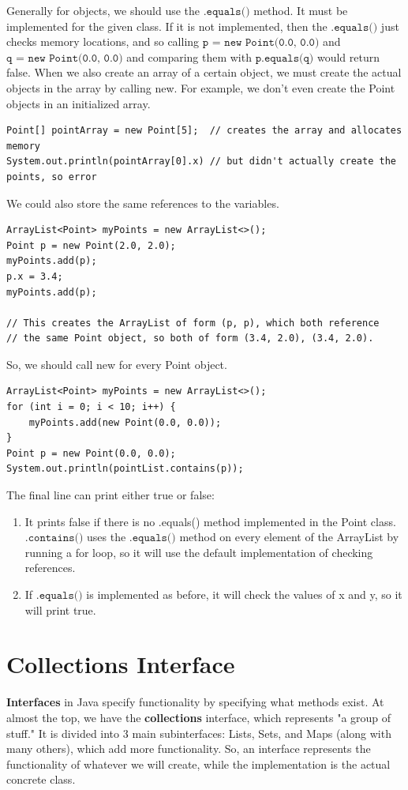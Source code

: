 \documentclass{article}
\theoremstyle{definition}
\theoremstyle{remark}
\theoremstyle{definition}
\begin{document}
Generally for objects, we should use the $\texttt{.equals()}$ method. It must be implemented for the given class. If it is not implemented, then the $\texttt{.equals()}$ just checks memory locations, and so calling $\texttt{p = new Point(0.0, 0.0)}$ and $\texttt{q = new Point(0.0, 0.0)}$ and comparing them with $\texttt{p.equals(q)}$ would return false. When we also create an array of a certain object, we must create the actual objects in the array by calling new. For example, we don't even create the Point objects in an initialized array. 
\begin{verbatim}
Point[] pointArray = new Point[5];  // creates the array and allocates memory 
System.out.println(pointArray[0].x) // but didn't actually create the points, so error
\end{verbatim}
We could also store the same references to the variables. 
\begin{verbatim}
ArrayList<Point> myPoints = new ArrayList<>(); 
Point p = new Point(2.0, 2.0); 
myPoints.add(p); 
p.x = 3.4; 
myPoints.add(p); 

// This creates the ArrayList of form (p, p), which both reference 
// the same Point object, so both of form (3.4, 2.0), (3.4, 2.0). 
\end{verbatim}
So, we should call new for every Point object. 
\begin{verbatim}
ArrayList<Point> myPoints = new ArrayList<>(); 
for (int i = 0; i < 10; i++) {
    myPoints.add(new Point(0.0, 0.0)); 
}
Point p = new Point(0.0, 0.0); 
System.out.println(pointList.contains(p)); 
\end{verbatim}
The final line can print either true or false: 
\begin{enumerate}
    \item It prints false if there is no .equals() method implemented in the Point class. $\texttt{.contains()}$ uses the $\texttt{.equals()}$ method on every element of the ArrayList by running a for loop, so it will use the default implementation of checking references. 
    \item If $\texttt{.equals()}$ is implemented as before, it will check the values of x and y, so it will print true.
\end{enumerate}

\section{Collections Interface}

\textbf{Interfaces} in Java specify functionality by specifying what methods exist. At almost the top, we have the \textbf{collections} interface, which represents "a group of stuff." It is divided into 3 main subinterfaces: Lists, Sets, and Maps (along with many others), which add more functionality. So, an interface represents the functionality of whatever we will create, while the implementation is the actual concrete class. 
\end{document}
